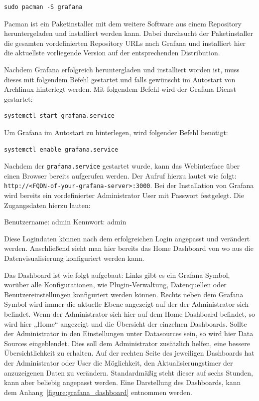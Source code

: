 {\begin{verbatim}
sudo pacman -S grafana
\end{verbatim}

Pacman ist ein Paketinstaller mit dem weitere Software aus einem Repository
heruntergeladen und installiert werden kann. Dabei durchsucht der
Paketinstaller die gesamten vordefinierten Repository URLs nach Grafana und
installiert hier die aktuellste vorliegende Version auf der entsprechenden
Distribution.

Nachdem Grafana erfolgreich heruntergladen und installiert worden ist, muss
dieses mit folgendem Befehl gestartet und falls gewünscht im Autostart von
Archlinux hinterlegt werden. Mit folgendem Befehl wird der Grafana Dienst
gestartet:
\begin{verbatim}
systemctl start grafana.service
\end{verbatim}

Um Grafana im Autostart zu hinterlegen, wird folgender Befehl benötigt:
\begin{verbatim}
systemctl enable grafana.service
\end{verbatim}

Nachdem der \texttt{grafana.service} gestartet wurde, kann das Webinterface
über einen Browser bereits aufgerufen werden. Der Aufruf hierzu lautet wie
folgt: \texttt{http://<FQDN-of-your-grafana-server>:3000}. Bei der Installation
von Grafana wird bereits ein vordefinierter Administrator User mit Passwort
festgelegt. Die Zugangsdaten hierzu lauten:

\begin{outline}
  \1 Benutzername: admin
  \1 Kennwort: admin
\end{outline}

Diese Logindaten können nach dem erfolgreichen Login angepasst und verändert
werden. Anschließend sieht man hier bereits das Home Dashboard von wo aus die
Datenvisualisierung konfiguriert werden kann.

Das Dashboard ist wie folgt aufgebaut: Links gibt es ein Grafana Symbol,
worüber alle Konfigurationen, wie Plugin\hyp{}Verwaltung, Datenquellen oder
Benutzereinstellungen konfiguriert werden können. Rechts neben dem Grafana
Symbol wird immer die aktuelle Ebene angezeigt auf der der Administrator sich
befindet. Wenn der Administrator sich hier auf dem Home Dashboard befindet, so
wird hier „Home“ angezeigt und die Übersicht der einzelnen Dashboards. Sollte
der Administrator in den Einstellungen unter Datasources sein, so wird hier
Data Sources eingeblendet. Dies soll dem Administrator zusätzlich helfen, eine
bessere Übersichtlichkeit zu erhalten. Auf der rechten Seite des jeweiligen
Dashboards hat der Administrator oder User die Möglichkeit, den
Aktualisierungstimer der anzuzeigenen Daten zu verändern. Standardmäßig steht
dieser auf sechs Stunden, kann aber beliebig angepasst werden. Eine Darstellung
des Dashboards, kann dem Anhang~\ref{figure:grafana_dashboard} entnommen
werden.


}
